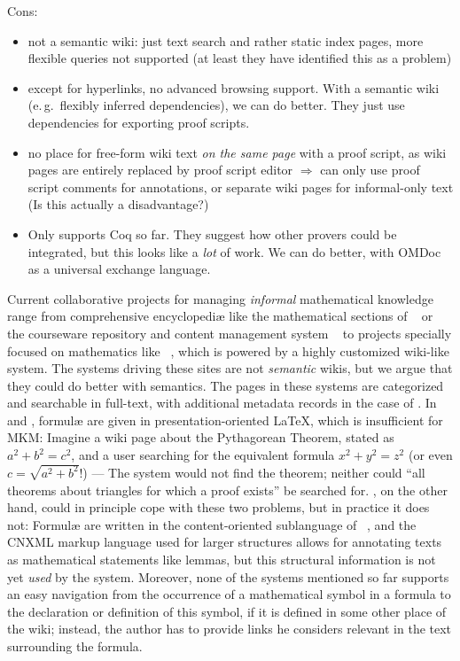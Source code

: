 \documentclass{llncs}
\begin{document}
\begin{todo}
  Cons:
  \begin{itemize}
  \item not a semantic wiki: just text search and rather static index pages, more flexible
    queries not supported (at least they have identified this as a problem)
  \item except for hyperlinks, no advanced browsing support.  With a semantic wiki
    (e.\,g.\ flexibly inferred dependencies), we can do better.  They just use
    dependencies for exporting proof scripts.
  \item no place for free-form wiki text \emph{on the same page} with a proof script, as
    wiki pages are entirely replaced by proof script editor $\Rightarrow$ can only use
    proof script comments for annotations, or separate wiki pages for informal-only text
    (Is this actually a disadvantage?)
  \item Only supports Coq so far.  They suggest how other provers could be integrated, but
    this looks like a \emph{lot} of work.  We can do better, with OMDoc as a universal
    exchange language.
  \end{itemize}
\end{todo}

Current collaborative projects for managing \emph{informal} mathematical knowledge range
from comprehensive encyclopediæ like the mathematical sections of
~\cite{wikipedia} or the courseware repository and content management
system ~\cite{CNX:whitepaper} to projects specially focused on
mathematics like ~\cite{krowne03:collaborative-math-libraries}, which
is powered by a highly customized wiki-like system.  The systems driving these sites are
not \emph{semantic} wikis, but we argue that they could do better with semantics.  The
pages in these systems are categorized and searchable in full-text, with additional
metadata records in the case of .  In  and
, formulæ are given in presentation-oriented {\LaTeX}, which is
insufficient for MKM: Imagine a wiki page about the Pythagorean Theorem, stated as $a^2 +
b^2 = c^2$, and a user searching for the equivalent formula $x^2 + y^2 = z^2$ (or even
$c=\sqrt{a^2+b^2}$!) --- The system would not find the theorem; neither could ``all
theorems about triangles for which a proof exists'' be searched for.
, on the other hand, could in principle cope with these two problems,
but in practice it does not: Formulæ are written in the content-oriented sublanguage of
{\mathml}~\cite{CarlisleEd:MathML07}, and the CNXML markup language used for larger
structures allows for annotating texts as mathematical statements like lemmas, but this
structural information is not yet \emph{used} by the system.  Moreover, none of the
systems mentioned so far supports an easy navigation from the occurrence of a mathematical
symbol in a formula to the declaration or definition of this symbol, if it is defined in
some other place of the wiki; instead, the author has to provide links he considers
relevant in the text surrounding the formula.
\end{document}
